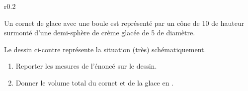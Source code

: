 
\begin{exercice}\label{exosmath-0095}


\begin{wrapfigure}{r}{0.2\textwidth}
    \centering

\end{wrapfigure}

    Un cornet de glace avec une boule est représenté par un cône de \unit{10}{\centi\meter} de hauteur surmonté d'une demi-sphère de crème glacée de \unit{5}{\centi\meter} de diamètre.

    Le dessin ci-contre représente la situation (très) schématiquement.

    \begin{enumerate}
        \item
            Reporter les mesures de l'énoncé sur le dessin.
        \item
            Donner le volume total du cornet et de la glace en \centi\cubic\meter.
    \end{enumerate}


%



\end{exercice}
